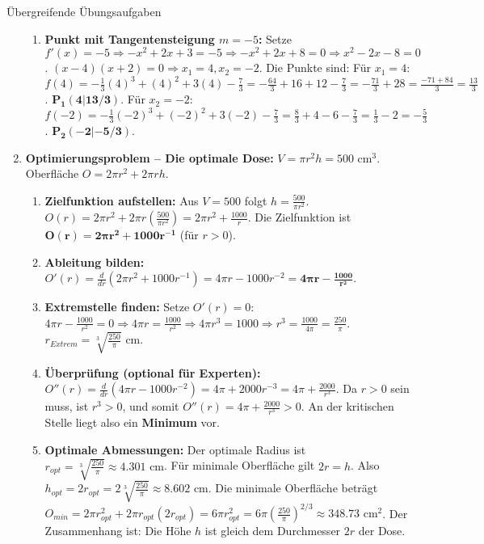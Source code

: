 \begin{loesungsumgebung}{Übergreifende Übungsaufgaben}
\begin{enumerate}
\begin{enumerate}[label=(\alph*)]
        \item \textbf{Punkt mit Tangentensteigung $m=-5$:}
        Setze $f'(x) = -5 \Rightarrow -x^2+2x+3 = -5 \Rightarrow -x^2+2x+8=0 \Rightarrow x^2-2x-8=0$.
        $(x-4)(x+2)=0 \Rightarrow x_1=4, x_2=-2$.
        Die Punkte sind:
        Für $x_1=4$: $f(4) = -\frac{1}{3}(4)^3 + (4)^2 + 3(4) - \frac{7}{3} = -\frac{64}{3} + 16 + 12 - \frac{7}{3} = -\frac{71}{3} + 28 = \frac{-71+84}{3} = \frac{13}{3}$. $\mathbf{P_1(4|13/3)}$.
        Für $x_2=-2$: $f(-2) = -\frac{1}{3}(-2)^3 + (-2)^2 + 3(-2) - \frac{7}{3} = \frac{8}{3} + 4 - 6 - \frac{7}{3} = \frac{1}{3} - 2 = -\frac{5}{3}$. $\mathbf{P_2(-2|-5/3)}$.
    \end{enumerate}

    \item \textbf{Optimierungsproblem – Die optimale Dose:}
    $V = \pi r^2 h = 500 \text{ cm}^3$. Oberfläche $O = 2\pi r^2 + 2\pi r h$.
    \begin{enumerate}[label=(\alph*)]
        \item \textbf{Zielfunktion aufstellen:} Aus $V=500$ folgt $h = \frac{500}{\pi r^2}$.
        $O(r) = 2\pi r^2 + 2\pi r \left(\frac{500}{\pi r^2}\right) = 2\pi r^2 + \frac{1000}{r}$.
        Die Zielfunktion ist $\mathbf{O(r) = 2\pi r^2 + 1000r^{-1}}$ (für $r>0$).
        \item \textbf{Ableitung bilden:} $O'(r) = \frac{d}{dr}(2\pi r^2 + 1000r^{-1}) = 4\pi r - 1000r^{-2} = \mathbf{4\pi r - \frac{1000}{r^2}}$.
        \item \textbf{Extremstelle finden:} Setze $O'(r)=0$:
        $4\pi r - \frac{1000}{r^2} = 0 \Rightarrow 4\pi r = \frac{1000}{r^2} \Rightarrow 4\pi r^3 = 1000 \Rightarrow r^3 = \frac{1000}{4\pi} = \frac{250}{\pi}$.
        $r_{Extrem} = \sqrt[3]{\frac{250}{\pi}} \text{ cm}$.
        \item \textbf{Überprüfung (optional für Experten):} $O''(r) = \frac{d}{dr}(4\pi r - 1000r^{-2}) = 4\pi + 2000r^{-3} = 4\pi + \frac{2000}{r^3}$.
        Da $r>0$ sein muss, ist $r^3>0$, und somit $O''(r) = 4\pi + \frac{2000}{r^3} > 0$.
        An der kritischen Stelle liegt also ein \textbf{Minimum} vor.
        \item \textbf{Optimale Abmessungen:}
        Der optimale Radius ist $r_{opt} = \sqrt[3]{\frac{250}{\pi}} \approx 4.301 \text{ cm}$.
        Für minimale Oberfläche gilt $2r=h$. Also $h_{opt} = 2r_{opt} = 2\sqrt[3]{\frac{250}{\pi}} \approx 8.602 \text{ cm}$.
        Die minimale Oberfläche beträgt $O_{min} = 2\pi r_{opt}^2 + 2\pi r_{opt} (2r_{opt}) = 6\pi r_{opt}^2 = 6\pi \left(\frac{250}{\pi}\right)^{2/3} \approx 348.73 \text{ cm}^2$.
        Der Zusammenhang ist: Die Höhe $h$ ist gleich dem Durchmesser $2r$ der Dose.
    \end{enumerate}


\end{enumerate}
\end{loesungsumgebung}
